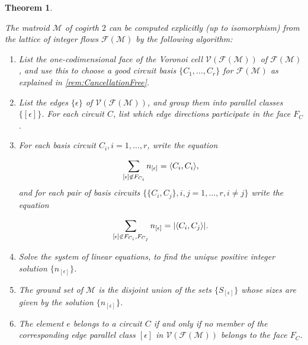 \documentclass[12pt]{report}
\newtheorem{theorem}{Theorem}[chapter]
\theoremstyle{definition}
\DeclarePairedDelimiter\abs{\lvert}{\rvert}
\DeclarePairedDelimiter\iprod{\langle}{\rangle}
\def\calF{\mathcal F}
\def\calM{\mathcal M}
\def\calV{\mathcal V}
\theoremstyle{upright}
\begin{document}
\begin{theorem}\label{thm:MatroidReconstruction}

    The matroid $\calM$ of cogirth $2$ can be computed explicitly (up to isomorphism) from the lattice of integer flows $\calF(\calM)$ by the following algorithm:

    \begin{enumerate}
        \item List the one-codimensional face of the Voronoi cell $\calV(\calF(\calM))$ of $\calF(\calM)$, and use this to choose a good circuit basis $\{C_1, \dots, C_r\}$ for $\calF(\calM)$ as explained in \cref{rem:CancellationFree}.
        \item List the edges $\{\epsilon\}$ of $\calV(\calF(\calM))$, and group them into parallel classes $\{[\epsilon]\}$.
        For each circuit $C$, list which edge directions participate in the face $F_C$.
        \item For each basis circuit $C_i, i=1, \dots, r$, write the equation

        \[\sum_{[\epsilon]\not\in F_{C_i}} n_{[\epsilon]}=\iprod*{C_i, C_i},\]
        and for each pair of basis circuits $\{\{C_i, C_j\}, i, j=1, \dots, r, i\neq j\}$ write the equation
        
        \[\sum_{[\epsilon]\not\in F_{C_i}, F_{C_j}} n_{[\epsilon]}=\abs*{\iprod*{C_i, C_j}}.\]
        \item Solve the system of linear equations, to find the unique positive integer solution $\{n_{[\epsilon]}\}$.
        \item The ground set of $\calM$ is the disjoint union of the sets $\{S_{[\epsilon]}\}$ whose sizes are given by the solution $\{n_{[\epsilon]}\}$.
        \item The element $e$ belongs to a circuit $C$ if and only if no member of the corresponding edge parallel class $[\epsilon]$ in $\calV(\calF(\calM))$ belongs to the face $F_C$.
    \end{enumerate}
    
\end{theorem}
\end{document}
